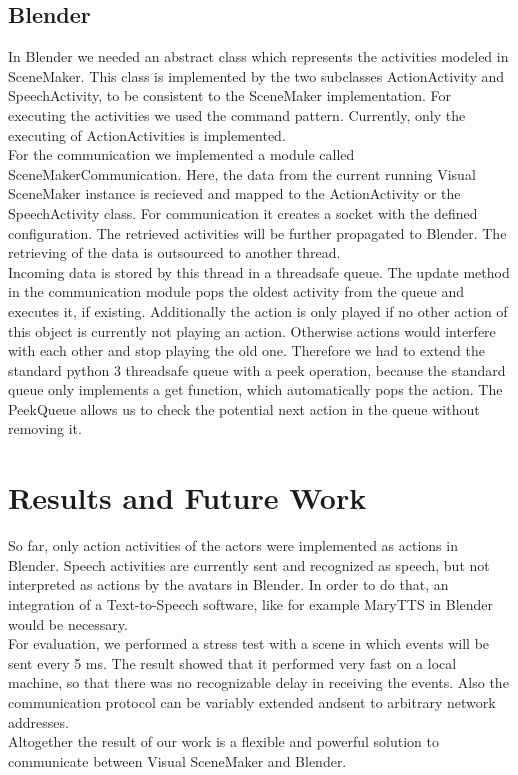 \documentclass[
10pt, %
a4paper, %
oneside,
headinclude,footinclude, %
BCOR5mm, %
]{scrartcl}
\begin{document}
\subsection{Blender}
In Blender we needed an abstract class which represents the activities modeled in SceneMaker. This class is implemented by the two subclasses  ActionActivity and SpeechActivity, to be consistent to the SceneMaker implementation. For executing the activities we used the command pattern. Currently, only the executing of ActionActivities is implemented.\\
For the communication we implemented a module called SceneMakerCommunication. Here, the data from the current running Visual SceneMaker instance is recieved and mapped to the ActionActivity or the SpeechActivity class. For communication it creates a socket with the defined configuration. The retrieved
activities will be further propagated to Blender. The retrieving of the data is outsourced to another thread.\\
Incoming data is stored by this thread in a threadsafe queue. The update method in the communication module pops the oldest activity from the queue and executes it, if existing. Additionally the action is only played if no other action of this object is currently not playing an action. Otherwise actions would interfere with each other and stop playing the old one. Therefore we had to extend the standard python 3 threadsafe queue with a peek operation, because the standard queue only implements a get function, which automatically pops the action. The PeekQueue allows us to check the potential next action in the queue without removing it.


\section{Results and Future Work}
So far, only action activities of the actors were implemented as actions in Blender. Speech activities are currently sent and recognized as speech, but not interpreted as actions by the avatars in Blender. In order to do that, an integration of a Text-to-Speech software, like for example MaryTTS in Blender would be necessary. \\
For evaluation, we performed a stress test with a scene in which events will be sent every 5 ms. The result showed that it performed very fast on a local machine, so that there was no recognizable delay in receiving the events. Also the communication protocol can be variably extended andsent to arbitrary network addresses.\\
Altogether the result of our work is a flexible and powerful solution to communicate between Visual SceneMaker and Blender.
\end{document}

